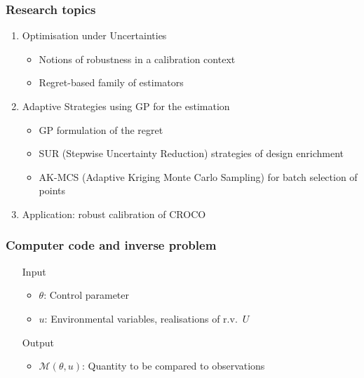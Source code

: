 \documentclass[11pt]{beamer}
\newcommand{\kk}{\theta}
\newcommand{\uu}{u}
\newcommand{\UU}{U}
\begin{document}


\begin{frame}
  \frametitle{Research topics}
  \begin{enumerate}
  \item Optimisation under Uncertainties
    \begin{itemize}
    \item Notions of robustness in a calibration context
    \item Regret-based family of estimators
    \end{itemize}



  \item Adaptive Strategies using GP for the estimation
    \begin{itemize}
    \item GP formulation of the regret
    \item SUR (Stepwise Uncertainty Reduction) strategies of design enrichment
    \item AK-MCS (Adaptive Kriging Monte Carlo Sampling) for batch selection of points
    \end{itemize}


    
  \item Application: robust calibration of CROCO
  \end{enumerate}
\end{frame}

\begin{frame}[t]
\frametitle{Computer code and inverse problem}
\begin{itemize}
	\item[Input] 
	\begin{itemize}
		\item $\kk$: Control parameter
		\item $\uu$: Environmental variables, realisations of r.v.\ $\UU$
	\end{itemize}
	\item[Output] \begin{itemize}
          \item $\mathcal{M}(\kk,\uu)$: Quantity to be compared to observations%
	\end{itemize}
      \end{itemize}
      \vfill
      {}
    \end{frame}
\end{document}
